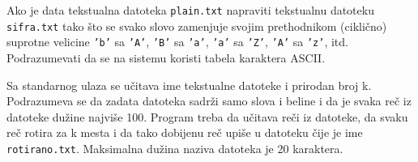 \begin{Exercise}[label=p3_]         
Ako je data tekstualna datoteka \verb|plain.txt| napraviti tekstualnu
datoteku \verb|sifra.txt| tako \v sto se svako slovo zamenjuje svojim
prethodnikom (cikli\v cno) suprotne velicine \verb|’b’| sa \verb|’A’|,
\verb|’B’| sa \verb|’a’|, \verb|’a’| sa \verb|’Z’|, \verb|’A’| sa
\verb|’z’|, itd. Podrazumevati da se na sistemu koristi tabela
karaktera ASCII.
\end{Exercise}
\ifresenja
\begin{Answer}[ref=p3_]
\end{Answer}
\fi


\begin{Exercise}[label=p3_]         
Sa standarnog ulaza se u\v citava ime tekstualne datoteke i prirodan
broj k. Podrazumeva se da zadata datoteka sadr\v zi samo slova i
beline i da je svaka re\v c iz datoteke du\v zine najvi\v se
100. Program treba da u\v citava re\v ci iz datoteke, da svaku re\v c
rotira za k mesta i da tako dobijenu re\v c upi\v se u datoteku \v
cije je ime \verb|rotirano.txt|. Maksimalna du\v zina naziva datoteka
je 20 karaktera. \\
\end{Exercise}
\ifresenja
\begin{Answer}[ref=p3_]
\end{Answer}
\fi


